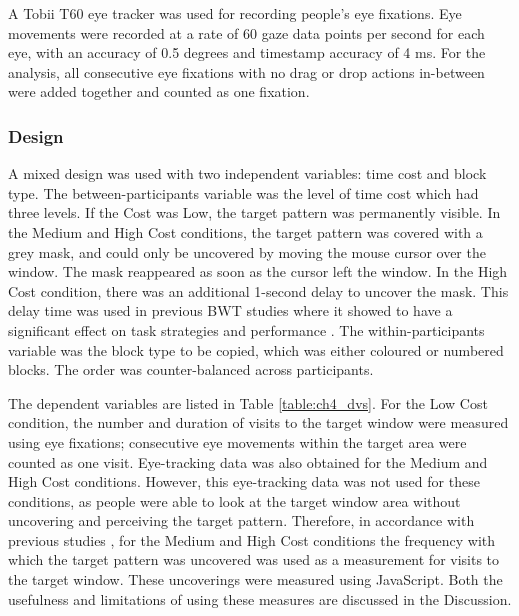 A Tobii T60 eye tracker was used for recording people's eye fixations. Eye movements were recorded at a rate of 60 gaze data points per second for each eye, with an accuracy of 0.5 degrees and timestamp accuracy of 4 ms. For the analysis, all consecutive eye fixations with no drag or drop actions in-between were added together and counted as one fixation.

\subsubsection{Design}
A mixed design was used with two independent variables: time cost and block type. The between-participants variable was the level of time cost which had three levels. If the Cost was Low, the target pattern was permanently visible. In the Medium and High Cost conditions, the target pattern was covered with a grey mask, and could only be uncovered by moving the mouse cursor over the window. The mask reappeared as soon as the cursor left the window. In the High Cost condition, there was an additional 1-second delay to uncover the mask. This delay time was used in previous BWT studies where it showed to have a significant effect on task strategies and performance \citep{Gray2006, Morgan2009, Waldron2007}. The within-participants variable was the block type to be copied, which was either coloured or numbered blocks. The order was counter-balanced across participants.

The dependent variables are listed in Table \ref{table:ch4_dvs}. For the Low Cost condition, the number and duration of visits to the target window were measured using eye fixations; consecutive eye movements within the target area were counted as one visit. Eye-tracking data was also obtained for the Medium and High Cost conditions. However, this eye-tracking data was not used for these conditions, as people were able to look at the target window area without uncovering and perceiving the target pattern. Therefore, in accordance with previous studies \citep{Morgan2009, Patrick2014, Waldron2007, Waldron2011}, for the Medium and High Cost conditions the frequency with which the target pattern was uncovered was used as a measurement for visits to the target window. These uncoverings were measured using JavaScript. Both the usefulness and limitations of using these measures are discussed in the Discussion.
 
